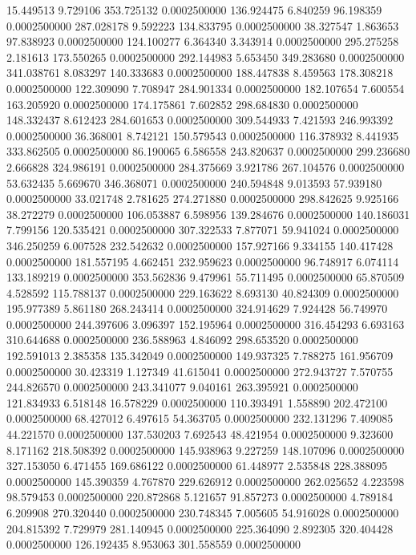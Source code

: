 15.449513 9.729106 353.725132 0.0002500000
136.924475 6.840259 96.198359 0.0002500000
287.028178 9.592223 134.833795 0.0002500000
38.327547 1.863653 97.838923 0.0002500000
124.100277 6.364340 3.343914 0.0002500000
295.275258 2.181613 173.550265 0.0002500000
292.144983 5.653450 349.283680 0.0002500000
341.038761 8.083297 140.333683 0.0002500000
188.447838 8.459563 178.308218 0.0002500000
122.309090 7.708947 284.901334 0.0002500000
182.107654 7.600554 163.205920 0.0002500000
174.175861 7.602852 298.684830 0.0002500000
148.332437 8.612423 284.601653 0.0002500000
309.544933 7.421593 246.993392 0.0002500000
36.368001 8.742121 150.579543 0.0002500000
116.378932 8.441935 333.862505 0.0002500000
86.190065 6.586558 243.820637 0.0002500000
299.236680 2.666828 324.986191 0.0002500000
284.375669 3.921786 267.104576 0.0002500000
53.632435 5.669670 346.368071 0.0002500000
240.594848 9.013593 57.939180 0.0002500000
33.021748 2.781625 274.271880 0.0002500000
298.842625 9.925166 38.272279 0.0002500000
106.053887 6.598956 139.284676 0.0002500000
140.186031 7.799156 120.535421 0.0002500000
307.322533 7.877071 59.941024 0.0002500000
346.250259 6.007528 232.542632 0.0002500000
157.927166 9.334155 140.417428 0.0002500000
181.557195 4.662451 232.959623 0.0002500000
96.748917 6.074114 133.189219 0.0002500000
353.562836 9.479961 55.711495 0.0002500000
65.870509 4.528592 115.788137 0.0002500000
229.163622 8.693130 40.824309 0.0002500000
195.977389 5.861180 268.243414 0.0002500000
324.914629 7.924428 56.749970 0.0002500000
244.397606 3.096397 152.195964 0.0002500000
316.454293 6.693163 310.644688 0.0002500000
236.588963 4.846092 298.653520 0.0002500000
192.591013 2.385358 135.342049 0.0002500000
149.937325 7.788275 161.956709 0.0002500000
30.423319 1.127349 41.615041 0.0002500000
272.943727 7.570755 244.826570 0.0002500000
243.341077 9.040161 263.395921 0.0002500000
121.834933 6.518148 16.578229 0.0002500000
110.393491 1.558890 202.472100 0.0002500000
68.427012 6.497615 54.363705 0.0002500000
232.131296 7.409085 44.221570 0.0002500000
137.530203 7.692543 48.421954 0.0002500000
9.323600 8.171162 218.508392 0.0002500000
145.938963 9.227259 148.107096 0.0002500000
327.153050 6.471455 169.686122 0.0002500000
61.448977 2.535848 228.388095 0.0002500000
145.390359 4.767870 229.626912 0.0002500000
262.025652 4.223598 98.579453 0.0002500000
220.872868 5.121657 91.857273 0.0002500000
4.789184 6.209908 270.320440 0.0002500000
230.748345 7.005605 54.916028 0.0002500000
204.815392 7.729979 281.140945 0.0002500000
225.364090 2.892305 320.404428 0.0002500000
126.192435 8.953063 301.558559 0.0002500000
